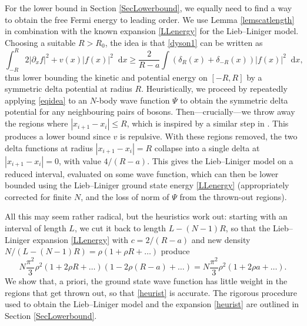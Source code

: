 \documentclass[a4paper,11pt]{article}
\newcommand*\diff{\mathop{}\!\mathrm{d}}
\numberwithin{equation}{section}
\begin{document}
For the lower bound in Section \ref{SecLowerbound}, we equally need to find a way to obtain the free Fermi energy to leading order. We use Lemma \ref{lemscatlength} in combination with the known expansion \eqref{LLenergy} for the Lieb--Liniger model. Choosing a suitable $R>R_0$, the idea is that \eqref{dyson1} can be written as 
\begin{equation}
\label{eqidea}
\int^{R}_{-R}2|\partial_x f|^2+v(x)|f(x)|^2\diff x\geq \frac{2}{R-a}\int (\delta_{R}(x)+\delta_{-{R}}(x))|f(x)|^2\diff x,
\end{equation}
thus lower bounding the kinetic and potential energy on $[-R,R]$ by a symmetric delta potential at radius $R$. Heuristically, we proceed by repeatedly applying \eqref{eqidea} to an $N$-body wave function $\Psi$ to obtain the symmetric delta potential for any neighbouring pairs of bosons. Then---crucially---we throw away the regions where $|x_{i+1}-x_i|\leq R$, which is inspired by a similar step in \cite{lieb2004one}. This produces a lower bound since $v$ is repulsive. With these regions removed, the two delta functions at radius $|x_{i+1}-x_i|= R$ collapse into a single delta at $|x_{i+1}-x_i|= 0$, with value $4/(R-a)$. This gives the Lieb--Liniger model on a reduced interval, evaluated on some wave function, which can then be lower bounded using the Lieb--Liniger ground state energy  \eqref{LLenergy} (appropriately corrected for finite $N$, and the loss of norm of $\Psi$ from the thrown-out regions). 

All this may seem rather radical, but the heuristics work out: starting with an interval of length $L$, we cut it back to length $L-(N-1)R$, so that the Lieb--Liniger expansion \eqref{LLenergy} with $c=2/(R-a)$ and new density $N/(L-(N-1)R)=\rho(1+\rho R+\dots)$ produce
\begin{equation}
\label{heurist}
N\frac{\pi^2}{3}\rho^2(1+2\rho R+\dots)(1-2\rho(R-a)+\dots)=N\frac{\pi^2}{3}\rho^2(1+2\rho a+\dots).
\end{equation}
We show that, a priori, the ground state wave function has little weight in the regions that get thrown out, so that \eqref{heurist} is accurate. The rigorous procedure used to obtain the Lieb--Liniger model and the expansion \eqref{heurist} are outlined in Section \ref{SecLowerbound}. 
\end{document}
